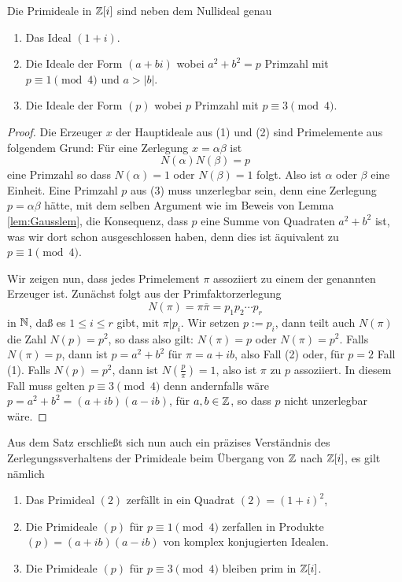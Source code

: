 \documentclass{book}
\begin{document}
\begin{thm} Die Primideale in $\mathbb{Z}[i]$ sind neben dem Nullideal genau 
    \label{thm:gaussprimes}
    \begin{enumerate}
        \item Das Ideal $(1+i)$.
        \item Die Ideale der Form $(a + bi)$ wobei $a^2 + b^2 = p$ Primzahl mit $p \equiv 1 \pmod{4}$ und $a > |b|$. 
        \item Die Ideale der Form $(p)$ wobei $p$ Primzahl mit $p \equiv 3 \pmod{4}$.
    \end{enumerate}
\end{thm}
\begin{proof}
    Die Erzeuger $x$ der Hauptideale aus (1) und (2) sind Primelemente aus
    folgendem Grund: Für eine Zerlegung $x = \alpha \beta$ ist 
    \[
        N(\alpha) N(\beta) = p
    \]
    eine Primzahl so dass $N(\alpha) = 1$ oder $N(\beta) = 1$ folgt. Also ist
    $\alpha$ oder $\beta$ eine Einheit. Eine Primzahl $p$ aus (3) muss
    unzerlegbar sein, denn eine Zerlegung $p = \alpha \beta$ hätte, mit dem
    selben Argument wie im Beweis von Lemma \ref{lem:Gausslem}, die Konsequenz,
    dass $p$ eine Summe von Quadraten $a^2 + b^2$ ist, was wir dort schon
    ausgeschlossen haben, denn dies ist äquivalent zu $p \equiv 1 \pmod{4}$.

    Wir zeigen nun, dass jedes Primelement $\pi$ assoziiert zu einem der
    genannten Erzeuger ist. Zunächst folgt aus der Primfaktorzerlegung
    \[
        N(\pi) = \pi \overline{\pi} = p_1 p_2 \cdots p_r
    \]
    in $\mathbb{N}$, daß es $1 \le i \le r$ gibt, mit $\pi|p_i$. Wir setzen $p := p_i$,
    dann teilt auch $N(\pi)$ die Zahl $N(p) = p^2$, so dass also gilt: $N(\pi)
    = p$ oder $N(\pi) = p^2$. Falls $N(\pi) = p$, dann ist $p = a^2 + b^2$ für
    $\pi = a + ib$, also Fall (2) oder, für $p=2$ Fall (1). Falls $N(p) = p^2$,
    dann ist $N(\frac{p}{\pi}) = 1$, also ist $\pi$ zu $p$ assoziiert. In
    diesem Fall muss gelten $p \equiv 3 \pmod{4}$ denn andernfalls wäre $p =
    a^2 + b^2 = (a +i b)(a-ib)$, für $a,b \in \mathbb{Z}$, so dass $p$ nicht
    unzerlegbar wäre. 
\end{proof}

\begin{exa}
    \label{exa:verzweigung}
    Aus dem Satz erschließt sich nun auch ein präzises Verständnis des
    Zerlegungssverhaltens der Primideale beim Übergang von $\mathbb{Z}$ nach
    $\mathbb{Z}[i]$, es gilt nämlich
    \begin{enumerate}
        \item Das Primideal $(2)$ zerfällt in ein Quadrat $(2) = (1+i)^2$, 
        \item Die Primideale $(p)$ für $p \equiv 1 \pmod{4}$ zerfallen in
            Produkte $(p) = (a + i b)(a-ib)$ von komplex konjugierten Idealen. 
        \item Die Primideale $(p)$ für $p \equiv 3 \pmod{4}$ bleiben prim in $\mathbb{Z}[i]$.
    \end{enumerate}
\end{exa}
\end{document}
